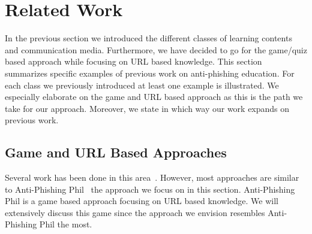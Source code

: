 
\section{Related Work}
\label{s:related_work}
In the previous section we introduced the different classes of learning contents and communication media. 
Furthermore, we have decided to go for the game/quiz based approach while focusing on URL based knowledge. 
This section summarizes specific examples of previous work on anti-phishing education.
For each class we previously introduced at least one example is illustrated. 
We especially elaborate on the game and URL based approach as this is the path we take for our approach. 
Moreover, we state in which way our work expands on previous work. 

\subsection{Game and URL Based Approaches}
Several work has been done in this area~\cite{arachchilage2011designing,arachchilage2012designing}. 
However, most approaches are similar to Anti-Phishing Phil~\cite{sheng2007antiphishingphil} the approach we focus on in this section.
Anti-Phishing Phil is a game based approach focusing on URL based knowledge. 
We will extensively discuss this game since the approach we envision resembles Anti-Phishing Phil the most.

